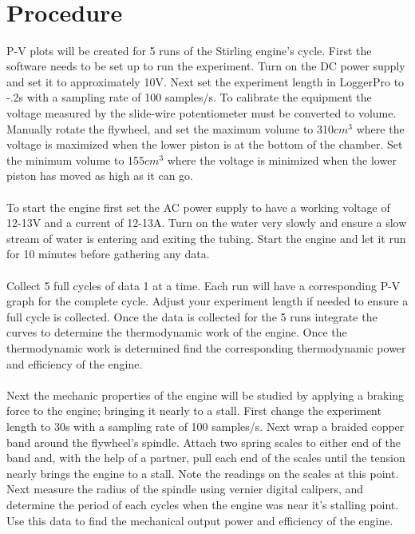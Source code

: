 \documentclass{article}
\begin{document}
\ 

\ 

\ 

\ 

\ 

\ 

\section{Procedure}
P-V plots will be created for 5 runs of the Stirling engine's cycle. First the software needs to be set up to run the experiment. Turn on the DC power supply and set it to approximately 10V. Next set the experiment length in LoggerPro to -.2s with a sampling rate of 100 samples/s. To calibrate the equipment the voltage measured by the slide-wire potentiometer must be converted to volume. Manually rotate the flywheel, and set the maximum volume to 310$cm^3$ where the voltage is maximized when the lower piston is at the bottom of the chamber. Set the minimum volume to 155$cm^3$ where the voltage is minimized when the lower piston has moved as high as it can go.\\\\
To start the engine first set the AC power supply to have a working voltage of 12-13V and a current of 12-13A. Turn on the water very slowly and ensure a slow stream of water is entering and exiting the tubing. Start the engine and let it run for 10 minutes before gathering any data.\\\\
Collect 5 full cycles of data 1 at a time. Each run will have a corresponding P-V graph for the complete cycle. Adjust your experiment length if needed to ensure a full cycle is collected. Once the data is collected for the 5 runs integrate the curves to determine the thermodynamic work of the engine. Once the thermodynamic work is determined find the corresponding thermodynamic power and efficiency of the engine.\\\\
Next the mechanic properties of the engine will be studied by applying a braking force to the engine; bringing it nearly to a stall. First change the experiment length to 30s with a sampling rate of 100 samples/s. Next wrap a braided copper band around the flywheel's spindle. Attach two spring scales to either end of the band and, with the help of a partner, pull each end of the scales until the tension nearly brings the engine to a stall. Note the readings on the scales at this point. Next measure the radius of the spindle using vernier digital calipers, and determine the period of each cycles when the engine was near it's stalling point. Use this data to find the mechanical output power and efficiency of the engine. 
\end{document}
